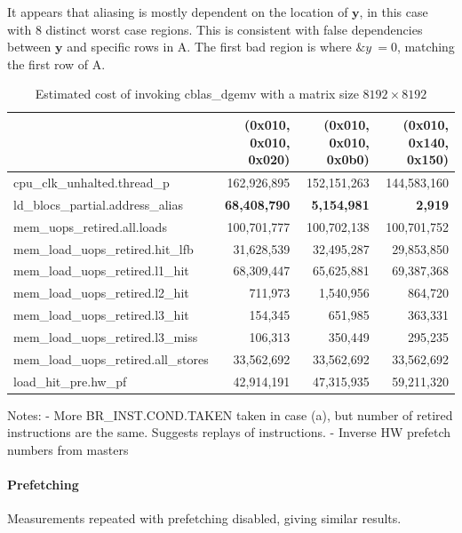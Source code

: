 \documentclass[a4paper,10pt,twocolumn,twoside]{article}
\newcommand{\perfctr}[1] {
  {\lowercase{#1}}
}
\begin{document}
It appears that aliasing is mostly dependent on the location of $\boldsymbol{y}$, in this case with 8 distinct worst case regions.
This is consistent with false dependencies between $\boldsymbol{y}$ and specific rows in A. 
The first bad region is where $\&y ~= 0$, matching the first row of A. 



\begin{table}[t]
  \caption{Estimated cost of invoking cblas\_dgemv with a matrix size $8192 \times 8192$}
  \label{tab:atlas8k}
  \small
  \centering
  \begin{tabular}{l r r r}
    \toprule
      & (0x010, 0x010, 0x020) & (0x010, 0x010, 0x0b0) & (0x010, 0x140, 0x150) \\
    \midrule
    \perfctr{cpu_clk_unhalted.thread_p} & 162,926,895 & 152,151,263 & 144,583,160 \\
    \perfctr{ld_blocs_partial.address_alias} & \textbf{68,408,790} & \textbf{5,154,981} & \textbf{2,919} \\

    \perfctr{mem_uops_retired.all.loads} & 100,701,777 & 100,702,138 & 100,701,752 \\
    \perfctr{mem_load_uops_retired.hit_lfb} & 31,628,539 & 32,495,287 & 29,853,850 \\
    \perfctr{mem_load_uops_retired.l1_hit} & 68,309,447 & 65,625,881 & 69,387,368 \\
    \perfctr{mem_load_uops_retired.l2_hit} & 711,973 & 1,540,956 & 864,720 \\
    \perfctr{mem_load_uops_retired.l3_hit} & 154,345 & 651,985 & 363,331 \\
    \perfctr{mem_load_uops_retired.l3_miss} & 106,313 & 350,449 & 295,235 \\
    \perfctr{mem_load_uops_retired.all_stores} & 33,562,692 & 33,562,692 & 33,562,692 \\

    \perfctr{load_hit_pre.hw_pf} & 42,914,191 & 47,315,935 & 59,211,320 \\
    \bottomrule
  \end{tabular}
\end{table}

Notes: 
 - More BR\_INST.COND.TAKEN taken in case (a), but number of retired instructions are the same. Suggests replays of instructions.
 - Inverse HW prefetch numbers from masters

\paragraph{Prefetching}
Measurements repeated with prefetching disabled, giving similar results. 
\end{document}
